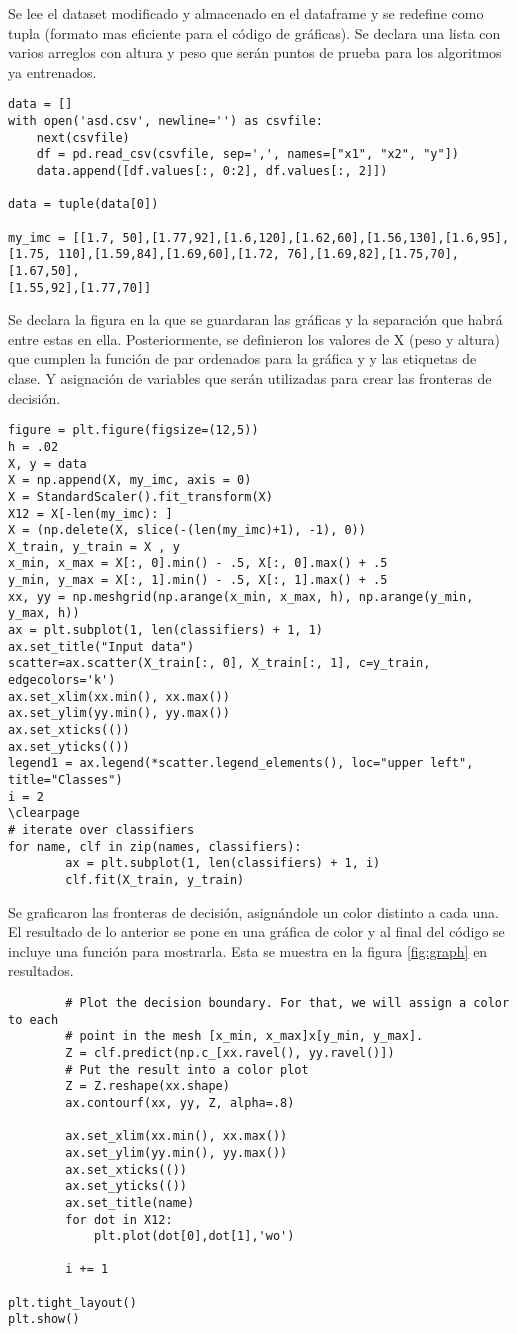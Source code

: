 \documentclass{article}
\begin{document}
Se lee el dataset modificado y almacenado en el dataframe y se redefine como tupla (formato mas eficiente para el código de gráficas). Se declara una lista con varios arreglos con altura y peso que serán puntos de prueba para los algoritmos ya entrenados.
\begin{lstlisting}
data = []
with open('asd.csv', newline='') as csvfile:
    next(csvfile)
    df = pd.read_csv(csvfile, sep=',', names=["x1", "x2", "y"])
    data.append([df.values[:, 0:2], df.values[:, 2]])
    
data = tuple(data[0])

my_imc = [[1.7, 50],[1.77,92],[1.6,120],[1.62,60],[1.56,130],[1.6,95],
[1.75, 110],[1.59,84],[1.69,60],[1.72, 76],[1.69,82],[1.75,70],[1.67,50],
[1.55,92],[1.77,70]]
\end{lstlisting}

Se declara la figura en la que se guardaran las gráficas y la separación que habrá entre estas en ella. Posteriormente, se definieron los valores de X (peso y altura) que cumplen la función de par ordenados para la gráfica y y las etiquetas de clase. Y asignación de variables que serán utilizadas para crear las fronteras de decisión.
\begin{lstlisting}
figure = plt.figure(figsize=(12,5))
h = .02  
X, y = data
X = np.append(X, my_imc, axis = 0)
X = StandardScaler().fit_transform(X)
X12 = X[-len(my_imc): ]
X = (np.delete(X, slice(-(len(my_imc)+1), -1), 0))
X_train, y_train = X , y
x_min, x_max = X[:, 0].min() - .5, X[:, 0].max() + .5
y_min, y_max = X[:, 1].min() - .5, X[:, 1].max() + .5
xx, yy = np.meshgrid(np.arange(x_min, x_max, h), np.arange(y_min, y_max, h))
ax = plt.subplot(1, len(classifiers) + 1, 1)
ax.set_title("Input data")
scatter=ax.scatter(X_train[:, 0], X_train[:, 1], c=y_train, edgecolors='k')
ax.set_xlim(xx.min(), xx.max())
ax.set_ylim(yy.min(), yy.max())
ax.set_xticks(())
ax.set_yticks(())
legend1 = ax.legend(*scatter.legend_elements(), loc="upper left", title="Classes")
i = 2   
\clearpage
# iterate over classifiers
for name, clf in zip(names, classifiers):
        ax = plt.subplot(1, len(classifiers) + 1, i)
        clf.fit(X_train, y_train)
\end{lstlisting}
Se graficaron las fronteras de decisión, asignándole un color distinto a cada una. El resultado de lo anterior se pone en una gráfica de color y al final del código se incluye una función para mostrarla. Esta se muestra en la figura \ref{fig:graph} en resultados.
\begin{lstlisting}
        # Plot the decision boundary. For that, we will assign a color to each
        # point in the mesh [x_min, x_max]x[y_min, y_max].
        Z = clf.predict(np.c_[xx.ravel(), yy.ravel()])
        # Put the result into a color plot
        Z = Z.reshape(xx.shape)
        ax.contourf(xx, yy, Z, alpha=.8)
      
        ax.set_xlim(xx.min(), xx.max())
        ax.set_ylim(yy.min(), yy.max())
        ax.set_xticks(())
        ax.set_yticks(())
        ax.set_title(name)
        for dot in X12:
            plt.plot(dot[0],dot[1],'wo')

        i += 1

plt.tight_layout()
plt.show()
\end{lstlisting}
\end{document}
